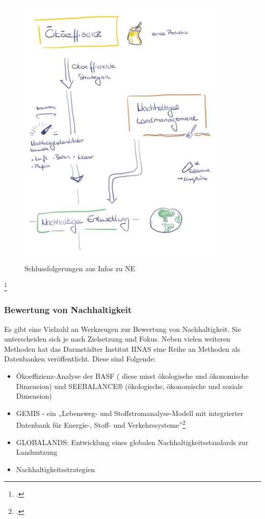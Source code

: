 \documentclass{scrartcl}
\begin{document}
\begin{figure}[htbp]
\centering
\includegraphics[width=10cm]{image_folder/NE_folgerungen.png}
\caption{Schlussfolgerungen aus Infos zu NE}
\label{fig:Folgerung_NE}
\end{figure}\footcite{Eigene Darstellung}

\subsubsection{Bewertung von Nachhaltigkeit}
Es gibt eine Vielzahl an Werkzeugen zur Bewertung von Nachhaltigkeit. Sie unterscheiden sich je nach Zielsetzung und Fokus. Neben vielen weiteren Methoden hat das Darmstädter Institut IINAS eine Reihe an Methoden als Datenbanken veröffentlicht. Diese sind Folgende:

\begin{itemize}
\item Ökoeffizienz-Analyse der BASF ( diese misst ökologische und ökonomische Dimension) und SEEBALANCE® (ökologische, ökonomische und soziale Dimension)
\item GEMIS - ein „Lebensweg- und Stoffstromanalyse-Modell mit integrierter Datenbank für Energie-, Stoff- und Verkehrssysteme”\footcite{}
\item GLOBALANDS: Entwicklung eines globalen Nachhaltigkeitsstandards zur Landnutzung
\item Nachhaltigkeitsstrategien
\end{itemize}
\end{document}
